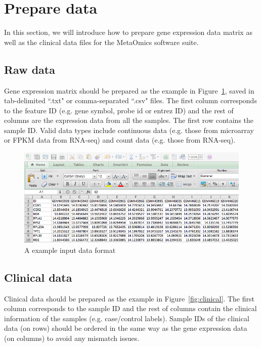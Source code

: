 
\section{Prepare data}
\label{sec:dataPrepare}
In this section, we will introduce how to prepare gene expression data matrix as well as the clinical data files for the MetaOmics software suite.

\subsection{Raw data}

Gene expression matrix should be prepared as the example in Figure~\ref{fig:dataMicroarray}, saved in tab-delimited ``.txt" or comma-separated ``.csv" files.
The first column corresponds to the feature ID (e.g. gene symbol, probe id or entrez ID) and the rest of columns are the expression data from all the samples.
The first row contains the sample ID.
Valid data types include continuous data (e.g. those from microarray or FPKM data from RNA-seq) and count data (e.g. those from RNA-seq).

\begin{figure}[H]
\begin{center}
\includegraphics[scale=0.5]{./figure/dataPreparation/dataMicroarray}
\caption{A example input data format}
\label{fig:dataMicroarray}
\end{center}
\end{figure}

\subsection{Clinical data}

Clinical data should be prepared as the example in Figure~\ref{fig:clinical}.
The first column corresponds to the sample ID and the rest of columns contain the clinical information of the samples (e.g. case/control labels). Sample IDs of the clinical data (on rows) should be ordered in the same way as the gene expression data (on columns) to avoid any mismatch issues.  

